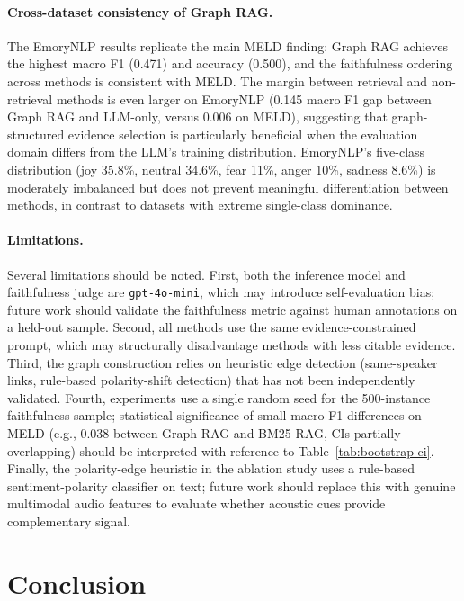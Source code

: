 \documentclass[runningheads]{llncs}
\begin{document}
\paragraph{Cross-dataset consistency of Graph RAG.}
The EmoryNLP results replicate the main MELD finding: Graph RAG achieves
the highest macro F1 (0.471) and accuracy (0.500), and the faithfulness
ordering across methods is consistent with MELD. The margin between
retrieval and non-retrieval methods is even larger on EmoryNLP (0.145
macro F1 gap between Graph RAG and LLM-only, versus 0.006 on MELD),
suggesting that graph-structured evidence selection is particularly
beneficial when the evaluation domain differs from the LLM's training
distribution. EmoryNLP's five-class distribution (joy 35.8\%, neutral
34.6\%, fear 11\%, anger 10\%, sadness 8.6\%) is moderately imbalanced
but does not prevent meaningful differentiation between methods, in
contrast to datasets with extreme single-class dominance.

\paragraph{Limitations.}
Several limitations should be noted. First, both the inference model and
faithfulness judge are \texttt{gpt-4o-mini}, which may introduce
self-evaluation bias; future work should validate the faithfulness metric
against human annotations on a held-out sample. Second, all methods use
the same evidence-constrained prompt, which may structurally disadvantage
methods with less citable evidence. Third, the graph construction relies
on heuristic edge detection (same-speaker links, rule-based polarity-shift
detection) that has not been independently validated. Fourth, experiments
use a single random seed for the 500-instance faithfulness sample;
statistical significance of small macro F1 differences on MELD
(e.g., 0.038 between Graph RAG and BM25 RAG, CIs partially overlapping)
should be interpreted with reference to Table~\ref{tab:bootstrap-ci}. Finally, the polarity-edge heuristic in the ablation study uses a rule-based sentiment-polarity classifier on text; future work should replace this with genuine multimodal audio features to evaluate whether acoustic cues provide complementary signal.

\section{Conclusion}
\label{sec:conclusion}
\end{document}
